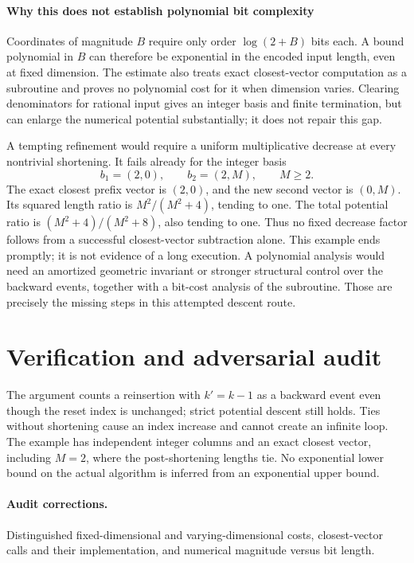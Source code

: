 \documentclass[11pt]{article}
\begin{document}
\paragraph{Why this does not establish polynomial bit complexity}
Coordinates of magnitude $B$ require only order $\log(2+B)$ bits each. A bound polynomial in $B$ can therefore be exponential in the encoded input length, even at fixed dimension. The estimate also treats exact closest-vector computation as a subroutine and proves no polynomial cost for it when dimension varies. Clearing denominators for rational input gives an integer basis and finite termination, but can enlarge the numerical potential substantially; it does not repair this gap.

A tempting refinement would require a uniform multiplicative decrease at every nontrivial shortening. It fails already for the integer basis
\[
 b_1=(2,0),\qquad b_2=(2,M),\qquad M\geq2.
\]
The exact closest prefix vector is $(2,0)$, and the new second vector is $(0,M)$. Its squared length ratio is $M^2/(M^2+4)$, tending to one. The total potential ratio is $(M^2+4)/(M^2+8)$, also tending to one. Thus no fixed decrease factor follows from a successful closest-vector subtraction alone. This example ends promptly; it is not evidence of a long execution. A polynomial analysis would need an amortized geometric invariant or stronger structural control over the backward events, together with a bit-cost analysis of the subroutine. Those are precisely the missing steps in this attempted descent route.

\section{Verification and adversarial audit}
The argument counts a reinsertion with $k'=k-1$ as a backward event even though the reset index is unchanged; strict potential descent still holds. Ties without shortening cause an index increase and cannot create an infinite loop. The example has independent integer columns and an exact closest vector, including $M=2$, where the post-shortening lengths tie. No exponential lower bound on the actual algorithm is inferred from an exponential upper bound.
\paragraph{Audit corrections.} Distinguished fixed-dimensional and varying-dimensional costs, closest-vector calls and their implementation, and numerical magnitude versus bit length.
\end{document}
